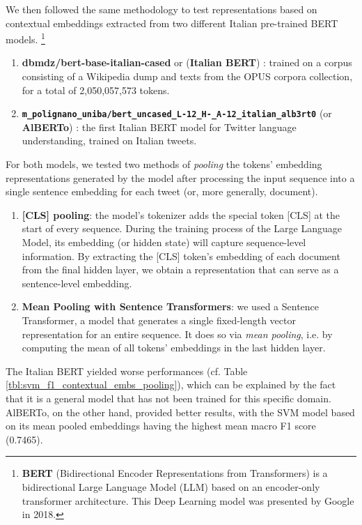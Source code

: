We then followed the same methodology to test representations based on contextual embeddings extracted from two different Italian pre-trained BERT models. \footnote{\textbf{BERT} (Bidirectional Encoder Representations from Transformers) is a bidirectional Large Language Model (LLM) based on an encoder-only transformer architecture. This Deep Learning model was presented by Google in 2018.}
\begin{enumerate}
    \item \textbf{dbmdz/bert-base-italian-cased} or (\textbf{Italian BERT}) \cite{italian_bert}:  trained on a corpus consisting of a Wikipedia dump and texts from the OPUS corpora collection, for a total of 2,050,057,573 tokens.
    \item \texttt{\textbf{m\_polignano\_uniba/bert\_uncased\_L{-}12\_H{-}\_A{-}12\_italian\_alb3rt0}} (or \textbf{AlBERTo}) \cite{alberto}:  the first Italian BERT model for Twitter language understanding, trained on Italian tweets.
\end{enumerate}

For both models, we tested two methods of \textit{pooling} the tokens' embedding representations generated by the model after processing the input sequence into a single sentence embedding for each tweet (or, more generally, document).
\begin{enumerate}
    \item \textbf{[CLS] pooling}: the model's tokenizer adds the special token [CLS] at the start of every sequence. During the training process of the Large Language Model, its embedding (or hidden state) will capture sequence-level information. By extracting the [CLS] token's embedding of each document from the final hidden layer, we obtain a representation that can serve as a sentence-level embedding.
    \item \textbf{Mean Pooling with Sentence Transformers}: we used a Sentence Transformer, a model that generates a single fixed-length vector representation for an entire sequence. It does so via \textit{mean pooling}, i.e. by computing the mean of all tokens' embeddings in the last hidden layer.
\end{enumerate}

The Italian BERT yielded worse performances (cf. Table \ref{tbl:svm_f1_contextual_embs_pooling}), which can be explained by the fact that it is a general model that has not been trained for this specific domain. AlBERTo, on the other hand, provided better results, with the SVM model based on its mean pooled embeddings having the highest mean macro F1 score (0.7465).
    

